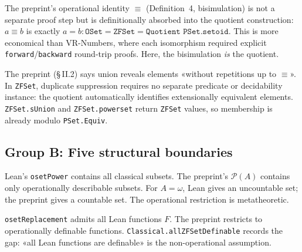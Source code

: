 \begin{remark}
\label{rem:A1_bisim}
\leanok
{}
The preprint's operational identity $\equiv$ (Definition~4, bisimulation)
is not a separate proof step but is definitionally absorbed into the
quotient construction: $a \equiv b$ is exactly $a = b : \texttt{OSet}
= \texttt{ZFSet} = \texttt{Quotient PSet.setoid}$.  This is more
economical than VR-Numbers, where each isomorphism required explicit
\texttt{forward}/\texttt{backward} round-trip proofs.  Here, the
bisimulation \emph{is} the quotient.
\end{remark}

\begin{remark}
\label{rem:A2_dedup}
\leanok
{}
The preprint (§\,II.2) says union reveals elements «without repetitions
up to $\equiv$».  In \texttt{ZFSet}, duplicate suppression requires no
separate predicate or decidability instance: the quotient automatically
identifies extensionally equivalent elements.  \texttt{ZFSet.sUnion}
and \texttt{ZFSet.powerset} return \texttt{ZFSet} values, so membership
is already modulo \texttt{PSet.Equiv}.
\end{remark}

\subsection*{Group B: Five structural boundaries}

\begin{remark}
\label{rem:B1_power}
\leanok
{}
Lean's \texttt{osetPower} contains all classical subsets.  The
preprint's $\mathcal{P}(A)$ contains only operationally describable
subsets.  For $A = \omega$, Lean gives an uncountable set; the
preprint gives a countable set.  The operational restriction is
metatheoretic.
\end{remark}

\begin{remark}
\label{rem:B2_repl}
\leanok
{}
\texttt{osetReplacement} admits all Lean functions $F$.  The preprint
restricts to operationally definable functions.  \texttt{Classical.allZFSetDefinable}
records the gap: «all Lean functions are definable» is the non-operational
assumption.
\end{remark}

